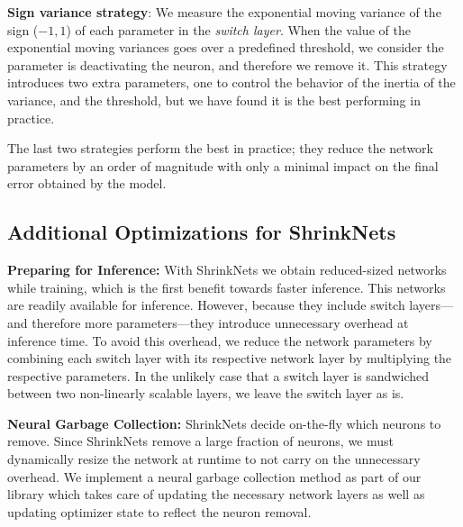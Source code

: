 \textbf{Sign variance strategy}: We measure the exponential moving variance of
the sign ($-1, 1$) of each parameter in the \textit{switch layer}. When the
value of the exponential moving variances goes over a predefined threshold, we
consider the parameter is deactivating the neuron, and therefore we remove it.
This strategy introduces two extra parameters, one to control the behavior of
the inertia of the variance, and the threshold, but we have found it is the
best performing in practice.

The last two strategies perform the best in practice; they reduce the network
parameters by an order of magnitude with only a minimal impact on the final
error obtained by the model.


\subsection{Additional Optimizations for ShrinkNets}

\noindent\textbf{Preparing for Inference: } With ShrinkNets we obtain
reduced-sized networks while training, which is the first benefit towards faster
inference. This networks are readily available for inference. However, because
they include switch layers---and therefore more parameters---they introduce
unnecessary overhead at inference time. To avoid this overhead, we reduce the
network parameters by combining each switch layer with its respective network
layer by multiplying the respective parameters.  In the unlikely case that a switch
layer is sandwiched between two non-linearly scalable layers, we leave the
switch layer as is.

\noindent\textbf{Neural Garbage Collection: }ShrinkNets decide on-the-fly which
neurons to remove. Since ShrinkNets remove a large fraction of neurons, we must
dynamically resize the network at runtime to not carry on the 
unnecessary overhead. We implement a neural garbage collection method as part of
our library which takes care of updating the necessary network layers as well as
updating optimizer state to reflect the neuron removal. 


